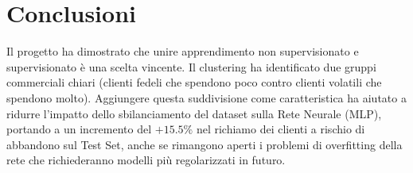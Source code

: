 \documentclass[a4paper,11pt]{article}
\begin{document}
\section{Conclusioni}
\label{sec:conclusioni}
Il progetto ha dimostrato che unire apprendimento non supervisionato e supervisionato è una scelta vincente. Il clustering ha identificato due gruppi commerciali chiari (clienti fedeli che spendono poco contro clienti volatili che spendono molto). Aggiungere questa suddivisione come caratteristica ha aiutato a ridurre l'impatto dello sbilanciamento del dataset sulla Rete Neurale (MLP), portando a un incremento del $+15.5\%$ nel richiamo dei clienti a rischio di abbandono sul Test Set, anche se rimangono aperti i problemi di overfitting della rete che richiederanno modelli più regolarizzati in futuro.
\end{document}

